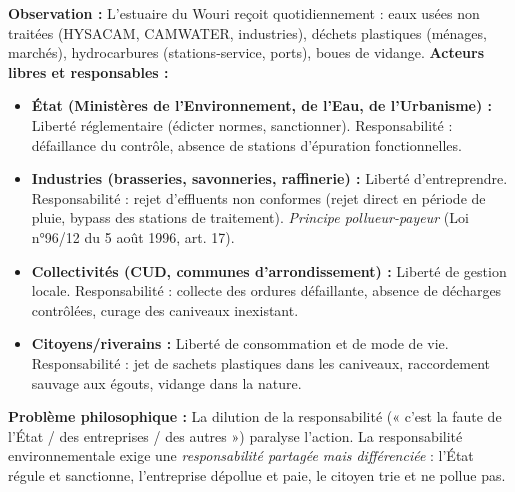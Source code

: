 \documentclass[11pt]{article}
\newcommand{\cle}[1]{{\popxbold\color{popdark}#1}}
\begin{document}
\begin{experience}
\textbf{Observation :} L'estuaire du Wouri reçoit quotidiennement : eaux usées non traitées (HYSACAM, CAMWATER, industries), déchets plastiques (ménages, marchés), hydrocarbures (stations-service, ports), boues de vidange.
\textbf{Acteurs libres et responsables :}
\begin{itemize}
    \item \textbf{État (Ministères de l'Environnement, de l'Eau, de l'Urbanisme) :} Liberté réglementaire (édicter normes, sanctionner). Responsabilité : défaillance du contrôle, absence de stations d'épuration fonctionnelles.
    \item \textbf{Industries (brasseries, savonneries, raffinerie) :} Liberté d'entreprendre. Responsabilité : rejet d'effluents non conformes (rejet direct en période de pluie, bypass des stations de traitement). \emph{Principe pollueur-payeur} (Loi n°96/12 du 5 août 1996, art. 17).
    \item \textbf{Collectivités (CUD, communes d'arrondissement) :} Liberté de gestion locale. Responsabilité : collecte des ordures défaillante, absence de décharges contrôlées, curage des caniveaux inexistant.
    \item \textbf{Citoyens/riverains :} Liberté de consommation et de mode de vie. Responsabilité : jet de sachets plastiques dans les caniveaux, raccordement sauvage aux égouts, vidange dans la nature.
\end{itemize}
\textbf{Problème philosophique :} La \cle{dilution de la responsabilité} (« c'est la faute de l'État / des entreprises / des autres ») paralyse l'action. La responsabilité environnementale exige une \emph{responsabilité partagée mais différenciée} : l'État régule et sanctionne, l'entreprise dépollue et paie, le citoyen trie et ne pollue pas.
\end{experience}
\end{document}
